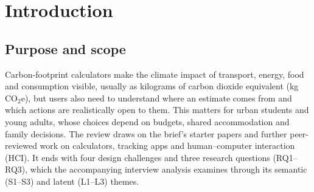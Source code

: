 \documentclass[12pt,a4paper,twocolumn]{article}
\begin{document}

\section{Introduction}
\subsection{Purpose and scope}
Carbon-footprint calculators make the climate impact of transport, energy, food and consumption visible, usually as kilograms of carbon dioxide equivalent (kg\,CO$_2$e), but users also need to understand where an estimate comes from and which actions are realistically open to them. This matters for urban students and young adults, whose choices depend on budgets, shared accommodation and family decisions. The review draws on the brief's starter papers and further peer-reviewed work on calculators, tracking apps and human--computer interaction (HCI). It ends with four design challenges and three research questions (RQ1--RQ3), which the accompanying interview analysis examines through its semantic (S1--S3) and latent (L1--L3) themes.
\end{document}
